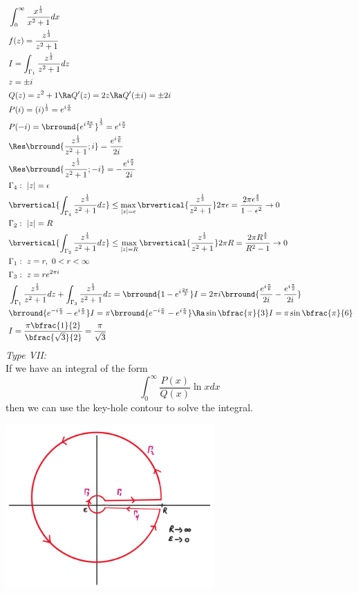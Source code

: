 \begin{align*}
    &\int_0^\infty\frac{x^{\frac{1}{3}}}{x^2+1}dx\\
    &f(z)=\frac{z^\frac{1}{3}}{z^2+1}\\
    &I=\int_{\Gamma_1}\frac{z^{\frac{1}{3}}}{z^2+1}dz\\
    &z=\pm i\\
    &Q(z)=z^2+1\Ra Q'(z)=2z\Ra Q'(\pm i)=\pm 2i\\
    &P(i)=(i)^{\frac{1}{3}}= e^{i\frac{\pi}{6}}\\
    &P(-i)=\brround{e^{i\frac{3\pi}{2}}}^{\frac{1}{3}}=e^{i\frac{\pi}{2}}\\
    &\Res\brround{\frac{z^{\frac{1}{3}}}{z^2+1};i}=\frac{e^{i\frac{\pi}{6}}}{2i}\\
    &\Res\brround{\frac{z^{\frac{1}{3}}}{z^2+1};-i}=-\frac{e^{i\frac{\pi}{2}}}{2i}\\
    &\Gamma_4:\ |z|=\epsilon\\
    &\brvertical{\int_{\Gamma_4}\frac{z^{\frac{1}{3}}}{z^2+1}dz}\leq \max_{|z|=\epsilon}\brvertical{\frac{z^{\frac{1}{3}}}{z^2+1}}2\pi \epsilon=\frac{2\pi\epsilon^{\frac{4}{3}}}{1-\epsilon^2}\to0\\\
    &\Gamma_2:\ |z|=R\\
    &\brvertical{\int_{\Gamma_2}\frac{z^{\frac{1}{3}}}{z^2+1}dz}\leq\max_{|z|=R}\brvertical{\frac{z^{\frac{1}{3}}}{z^2+1}}2\pi R=\frac{2\pi R^{\frac{4}{3}}}{R^2-1}\to 0\\
    &\Gamma_1:\ z=r,\ 0<r<\infty\\
    &\Gamma_3:\ z=re^{2\pi i}\\
    &\int_{\Gamma_1}\frac{z^{\frac{1}{3}}}{z^2+1}dz+\int_{\Gamma_3}\frac{z^{\frac{1}{3}}}{z^2+1}dz=\brround{1-e^{i\frac{2\pi}{3}}}I=2\pi i\brround{\frac{e^{i\frac{\pi}{6}}}{2i}-\frac{e^{i\frac{\pi}{2}}}{2i}}\\
    &\brround{e^{-i\frac{\pi}{3}}-e^{i\frac{\pi}{3}}}I=\pi\brround{e^{-i\frac{\pi}{6}}-e^{i\frac{\pi}{6}}}\Ra \sin\bfrac{\pi}{3}I=\pi\sin\bfrac{\pi}{6}\\
    &I=\frac{\pi\bfrac{1}{2}}{\bfrac{\sqrt{3}}{2}}=\frac{\pi}{\sqrt{3}}
\end{align*}
\textit{Type VII:}\\
If we have an integral of the form
\[\int_0^{\infty}\frac{P(x)}{Q(x)}\ln xdx\]
then we can use the key-hole contour to solve the integral.\\
\centerline{\includegraphics[width=0.6\textwidth]{Images/ComplexAnalysisPictures/KeyHole.png}}
